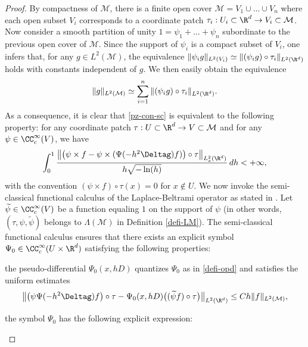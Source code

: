 \begin{proof}
By compactness of $\mathcal{M}$, there is a finite open cover $\mathcal{M}=V_1\cup \dots \cup V_n$ where each open subset $V_i$ corresponds to a coordinate patch $\tau_i:U_i\subset \R^d \to V_i\subset \mathcal{M}$.
Now consider a smooth partition of unity $1=\psi_1+\dots+\psi_n$ subordinate to the previous open cover of $\mathcal{M}$.
Since the support of $\psi_i$ is a compact subset of $V_i$, one infers that, for any $g\in L^2(\mathcal{M})$, the equivalence $\|\psi_i g\|_{L^2(V_i)}\simeq \|(\psi_i g)\circ \tau_i\|_{L^2(\R^d)}$ holds with constants independent of $g$. We then easily obtain the equivalence
\begin{equation*}
\|g\|_{L^2(\mathcal{M})}\simeq \sum_{i=1}^n \|(\psi_i g)\circ \tau_i\|_{L^2(\R^d)}.
\end{equation*}
As a consequence, it is clear that \eqref{pz-con-sc} is equivalent to the following property: for any coordinate patch $\tau:U\subset \R^d\to V\subset \mathcal{M}$ and for any $\psi\in \CC_c^\infty(V)$, we have
\begin{equation}\label{pz-con-loc2}
\int_{0}^1 \frac{\bigl\|\bigl(\psi \times f-\psi \times (\Psi(-h^2 \Deltag)f) \bigr) \circ \tau \bigr\|_{L_x^2(\R^d)}}{h\sqrt{-\ln(h)}}\, dh<+\infty,
\end{equation}
with the convention $(\psi\times f)\circ \tau(x)=0$ for $x\not\in U$.
We now invoke the semi-classical functional calculus of the Laplace-Beltrami operator as stated in \cite[Prop.\,2.1 with $N=1$ and $\sigma=0$]{burq2004}.
Let $\widetilde{\psi}\in \CC_c^\infty(V)$ be a function equaling $1$ on the support of $\psi$ (in other words, $(\tau,\psi,\widetilde{\psi})$ belongs to $\Lambda(\mathcal{M})$ in Definition \ref{defi-LM}).
The semi-classical functional calculus ensures that there exists an explicit symbol $\Psi_0\in \CC_c^\infty(U\times \R^d)$ satisfying the following properties:
\begin{enumeratei}
\item the pseudo-differential $\Psi_0(x,hD)$ quantizes $\Psi_0$ as in \eqref{defi-opd} and satisfies the uniform estimates
\begin{equation}\label{semi-cl}
\bigl\|\bigl(\psi \Psi(-h^2 \Deltag) f\bigr)\circ\tau -\Psi_0(x,h D) \bigl((\widetilde{\psi} f)\circ \tau\bigr)\bigr\|_{L^2(\R^d)}\leq C h\|f\|_{L^2(\mathcal{M})},
\end{equation}
\item the symbol $\Psi_0$ has the following explicit expression:
\begin{equation}\label{sym-p}

\end{equation}
\end{enumeratei}
\end{proof}
